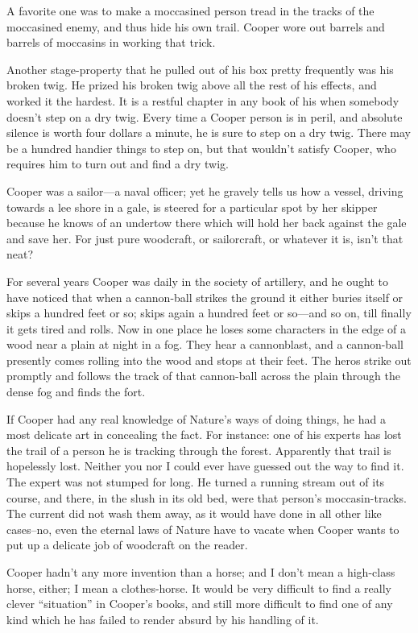 \documentclass{novelette} %
\begin{document}
A favorite one was to make a moccasined person tread
in the tracks of the moccasined enemy, and thus hide his own trail.
Cooper wore out barrels and barrels of moccasins in working that trick.

Another stage-property that he pulled out of his box pretty frequently
was his broken twig. He prized his broken twig above all the rest of his
effects, and worked it the hardest. It is a restful chapter in any book
of his when somebody doesn't step on a dry twig. Every time a Cooper person is
in peril, and absolute silence is worth four dollars a minute, he is
sure to step on a dry twig. There may be a hundred handier things to
step on, but that wouldn't satisfy Cooper, who requires him to turn
out and find a dry twig.

Cooper was a sailor---a naval officer; yet he gravely tells us how
a vessel, driving towards a lee shore in a gale, is steered for a
particular spot by her skipper because he knows of an undertow there
which will hold her back against the gale and save her. For just pure
woodcraft, or sailorcraft, or whatever it is, isn't that neat?

For several years Cooper was daily in the society of artillery, and he ought
to have noticed that when a cannon-ball strikes the ground it either
buries itself or skips a hundred feet or so; skips again a hundred feet
or so---and so on, till finally it gets tired and rolls. Now in one place
he loses some characters in the edge of a wood
near a plain at night in a fog. They hear a cannonblast, and a
cannon-ball presently comes rolling into the wood and stops at their
feet. The heros strike out promptly and follows the track of that cannon-ball
across the plain through the dense fog and finds the fort.

If Cooper had any real knowledge of Nature's ways of doing
things, he had a most delicate art in concealing the fact. For instance:
one of his experts has lost the trail of a person he is tracking through the
forest. Apparently that trail is hopelessly lost. Neither you nor I
could ever have guessed out the way to find it. The expert was not stumped
for long. He turned a running
stream out of its course, and there, in the slush in its old bed, were
that person's moccasin-tracks. The current did not wash them away, as
it would have done in all other like cases--no, even the eternal laws
of Nature have to vacate when Cooper wants to put up a delicate job of
woodcraft on the reader.

Cooper hadn't any more invention than a horse; and I don't mean a
high-class horse, either; I mean a clothes-horse. It would be very
difficult to find a really clever “situation” in Cooper's books, and
still more difficult to find one of any kind which he has failed to
render absurd by his handling of it.
\end{document}
